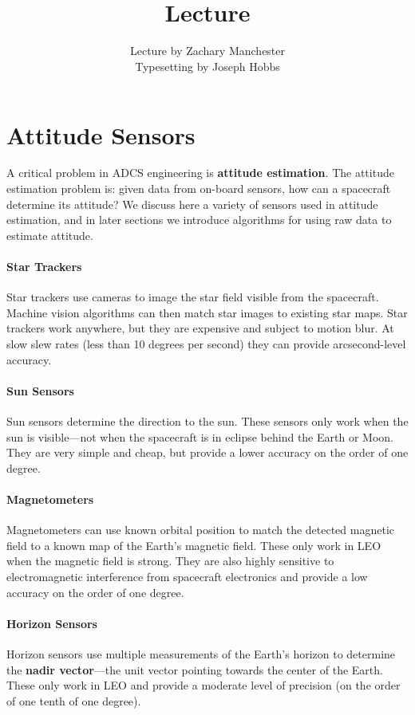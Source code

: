 \documentclass[12pt]{article}
\title{{\Large \thecourse} \\ \textbf{Lecture \thelecture} \\ \textsc{\thelecturename}}
\author{Lecture by Zachary Manchester \\ Typesetting by Joseph Hobbs}
\date{\thelecturedate}
\begin{document}
	\maketitle
	\tableofcontents
	
	\section{Attitude Sensors}
	
	A critical problem in ADCS engineering is \textbf{attitude estimation}.  The attitude estimation problem is: given data from on-board sensors, how can a spacecraft determine its attitude?  We discuss here a variety of sensors used in attitude estimation, and in later sections we introduce algorithms for using raw data to estimate attitude.
	
	\paragraph{Star Trackers} Star trackers use cameras to image the star field visible from the spacecraft.  Machine vision algorithms can then match star images to existing star maps.  Star trackers work anywhere, but they are expensive and subject to motion blur.  At slow slew rates (less than 10 degrees per second) they can provide arcsecond-level accuracy.
	
	\paragraph{Sun Sensors} Sun sensors determine the direction to the sun.  These sensors only work when the sun is visible---not when the spacecraft is in eclipse behind the Earth or Moon.  They are very simple and cheap, but provide a lower accuracy on the order of one degree.
	
	\paragraph{Magnetometers} Magnetometers can use known orbital position to match the detected magnetic field to a known map of the Earth's magnetic field.  These only work in LEO when the magnetic field is strong.  They are also highly sensitive to electromagnetic interference from spacecraft electronics and provide a low accuracy on the order of one degree.
	
	\paragraph{Horizon Sensors} Horizon sensors use multiple measurements of the Earth's horizon to determine the \textbf{nadir vector}---the unit vector pointing towards the center of the Earth.  These only work in LEO and provide a moderate level of precision (on the order of one tenth of one degree).
	
\end{document}
